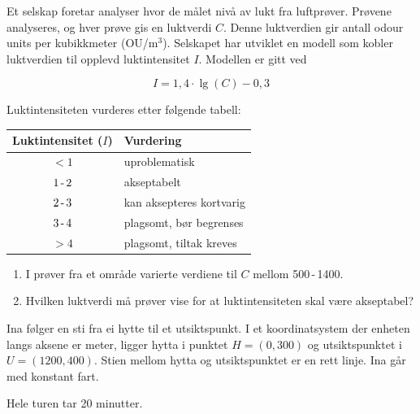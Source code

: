 Et selskap foretar analyser hvor de målet nivå av lukt fra luftprøver.
Prøvene analyseres, og hver prøve gis en luktverdi $C$. Denne luktverdien gir antall odour units per kubikkmeter (OU/$\text{m}^3$). Selskapet har utviklet en modell som kobler luktverdien til opplevd luktintensitet $I$. Modellen er gitt ved

\begin{equation*}
	I = 1,4 \cdot \lg(C) - 0,3
\end{equation*}

Luktintensiteten vurderes etter følgende tabell:

\begin{center}
	\begin{tabular}{c l}
		\hline
		\textbf{Luktintensitet ($I$)} & \textbf{Vurdering} \\
		\hline
		$< 1$   & uproblematisk \\
		$1\text{\,-\,}2$ & akseptabelt \\
		$2\text{\,-\,}3$ & kan aksepteres kortvarig \\
		$3\text{\,-\,}4$ & plagsomt, bør begrenses \\
		$> 4$   & plagsomt, tiltak kreves \\
		\hline
	\end{tabular}
\end{center}

\begin{enumerate}
	\item I prøver fra et område varierte verdiene til $C$ mellom 500\,-\,1400.
	\item[b)] Hvilken luktverdi må prøver vise for at luktintensiteten skal være akseptabel?
\end{enumerate}

Ina følger en sti fra ei hytte til et utsiktspunkt. I et koordinatsystem der
enheten langs aksene er meter, ligger hytta i punktet ${H=(0, 300)}$ og
utsiktspunktet i ${U=(1200, 400)}$. Stien mellom hytta og utsiktspunktet er en
rett linje. Ina går med konstant fart.


Hele turen tar 20 minutter.

